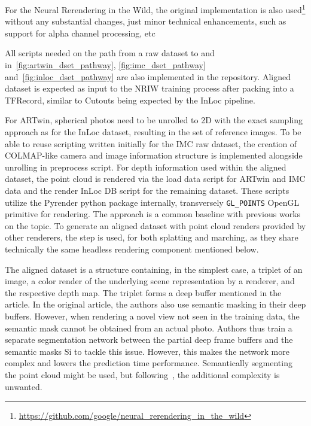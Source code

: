For the Neural Rerendering in the Wild, the original implementation is also
used\footnote{\url{https://github.com/google/neural_rerendering_in_the_wild}} without any
substantial changes, just minor technical enhancements, such as support for alpha channel
processing, etc

All scripts needed on the path from a raw dataset to  and 
in~\cref{fig:artwin_dset_pathway}, \cref{fig:imc_dset_pathway}
and~\cref{fig:inloc_dset_pathway} are also implemented in the repository. Aligned dataset
is expected as input to the NRIW training process after packing into a TFRecord, similar
to Cutouts being expected by the InLoc pipeline.

For ARTwin, spherical photos need to be unrolled to 2D with the exact sampling approach as
for the InLoc dataset, resulting in the set of reference images.  To be able to reuse
scripting written initially for the IMC raw dataset, the creation of COLMAP-like camera
and image information structure is implemented alongside unrolling in preprocess script.
For depth information used within the aligned dataset, the point cloud is rendered via the
load data script for ARTwin and IMC data and the render InLoc DB script for the remaining
dataset. These scripts utilize the Pyrender python package internally, transversely
\verb|GL_POINTS| OpenGL primitive for rendering. The approach is a common baseline with
previous works on the topic.  To generate an aligned dataset with point cloud renders
provided by other renderers, the  step is used, for both splatting
and marching, as they share technically the same headless rendering component mentioned
below.

The aligned dataset is a structure containing, in the simplest case, a triplet of an
image, a color render of the underlying scene representation by a renderer, and the
respective depth map. The triplet forms a deep buffer mentioned in the article.  In the
original article, the authors also use semantic masking in their deep buffers.  However,
when rendering a novel view not seen in the training data, the semantic mask cannot be
obtained from an actual photo. Authors thus train a separate segmentation network between
the partial deep frame buffers and the semantic masks Si to tackle this issue. However,
this makes the network more complex and lowers the prediction time performance.
Semantically segmenting the point cloud might be used, but following~\citet{Bastien}, the
additional complexity is unwanted.

